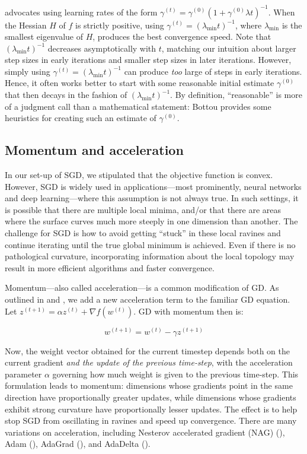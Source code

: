 \documentclass{report}
\begin{document}
\cite{bottou2012stochastic} advocates using learning rates of the form
$\gamma^{(t)} = \gamma^{(0)}(1 + \gamma^{(0)}\lambda t)^{-1}$. When the Hessian
$H$ of $f$ is strictly positive, using $\gamma^{(t)} =
(\lambda_{\mathrm{min}}t)^{-1}$, where $\lambda_{\mathrm{min}}$ is the smallest
eigenvalue of $H$, produces the best convergence speed. Note that $
(\lambda_{\mathrm{min}}t)^{-1}$ decreases asymptotically with $t$, matching our intuition
about larger step sizes in early iterations and smaller step sizes in later
iterations. However, simply using $\gamma^{(t)} =
(\lambda_{\mathrm{min}}t)^{-1}$ can produce \textit{too} large of steps in early
iterations. Hence, it often works better to start with some reasonable initial
estimate $\gamma^{(0)}$ that then decays in the fashion of
$(\lambda_{\mathrm{min}}t)^{-1}$. By definition, ``reasonable'' is more of a judgment
call than a mathematical statement: Bottou provides some heuristics for creating
such an estimate of $\gamma^{(0)}$.

\subsection{Momentum and acceleration}

In our set-up of SGD, we stipulated that the objective function is
convex. However, SGD is widely used in applications---most prominently, neural
networks and deep
learning---where this assumption is not
always true. In such settings, it is
possible that there are multiple local minima, and/or that there are areas where
the surface curves much more steeply in one dimension than another. The challenge for SGD is
how to avoid getting ``stuck'' in these local ravines and continue iterating
until the true global minimum is achieved. Even if there is no pathological
curvature, incorporating information about the local topology may result in more
efficient algorithms and faster convergence.

Momentum---also called acceleration---is a common modification of GD. As outlined in
\cite{rumelhart1986general} and 
\cite{qian1999momentum}, we add a new acceleration term to the familiar GD
equation. Let $z^{(t+1)} = \alpha z^{(t)} + \nabla f(w^{(t)})$. GD with
momentum then is:

\begin{equation}
	w^{(t+1)} = w^{(t)} - \gamma z^{(t+1)}
\end{equation}

Now, the weight vector obtained for the current timestep depends both on the
current gradient \textit{and the update of the previous time-step}, with the
acceleration parameter $\alpha$ governing how much weight is given to the
previous time-step. 
This formulation leads to momentum: dimensions whose
gradients point in the same direction have proportionally greater updates, while
dimensions whose gradients exhibit strong curvature have proportionally
lesser updates. The effect is to help stop SGD from oscillating in ravines and
speed up convergence. There are many variations on acceleration, including
Nesterov accelerated gradient (NAG) (\cite{nesterov}), Adam
(\cite{kingma2014adam}), AdaGrad
(\cite{duchi2011adaptive}), and AdaDelta (\cite{zeiler2012adadelta}).
\end{document}
